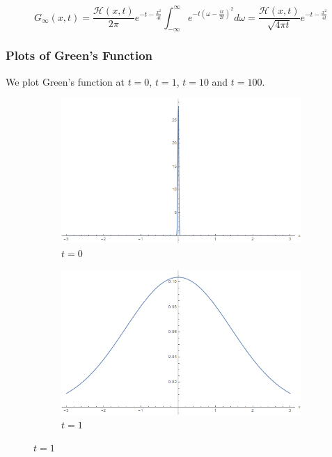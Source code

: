 \documentclass[12pt]{article}
\begin{document}
$$ G_{\infty}(x,t) = \frac{\mathcal{H}(x,t)}{2\pi}e^{-t-\frac{x^2}{4t}}\int_{-\infty}^{\infty}e^{-t(\omega - \frac{ix}{2t} )^2 }d\omega = \frac{\mathcal{H}(x,t)}{\sqrt{4\pi t}}e^{-t-\frac{x^2}{4t}} $$

\subsubsection{Plots of Green's Function}
We plot Green's function at $t=0$, $t=1$, $t=10$ and $t=100$.

\begin{figure}[H]
    \centering
    \begin{subfigure}[h]{0.4\textwidth}
        \includegraphics[width=\textwidth]{Part1Plots/t0}
        \caption{$t=0$}
        \label{fig:t0}
    \end{subfigure}
    \begin{subfigure}[h]{0.4\textwidth}
        \includegraphics[width=\textwidth]{Part1Plots/t1}
        \caption{$t=1$}
        \label{fig:t1}
    \end{subfigure}

\end{figure}
\end{document}

